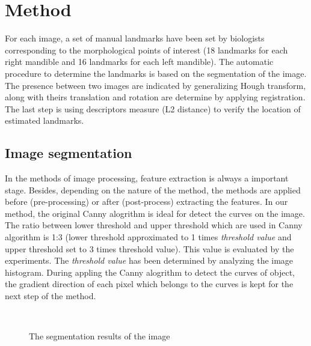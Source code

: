 \documentclass[twoside,twocolumn,10pt]{article}
\begin{document}
\section{Method}
For each image, a set of manual landmarks have been set by biologists corresponding to the morphological points of interest (18 landmarks for each right mandible and 16 landmarks for each left mandible). The automatic procedure to determine the landmarks is based on the segmentation of the image. The presence between two images are indicated by generalizing Hough transform, along with theirs translation and rotation are determine by applying registration. The last step is using descriptors measure (L2 distance) to verify the location of estimated landmarks.
\subsection{Image segmentation}
In the methods of image processing, feature extraction is always a important stage. Besides, depending on the nature of the method, the methods are applied before (pre-processing) or after (post-process) extracting the features. In our method, the original Canny alogrithm\cite{canny} is ideal for detect the curves on the image. The ratio between lower threshold and upper threshold which are used in Canny algorithm is 1:3 (lower threshold approximated to 1 times \textit{threshold value} and upper threshold set to 3 times threshold value). This value is evaluated by the experiments. The \textit{threshold value} has been determined by analyzing the image histogram. During appling the Canny alogrithm to detect the curves of object, the gradient direction of each pixel which belongs to the curves is kept for the next step of the method. 
\begin{figure}[h]
\centering
{}~~
\caption{The segmentation results of the image}
\label{canny}
\end{figure}~\\[0.2cm]
\end{document}
